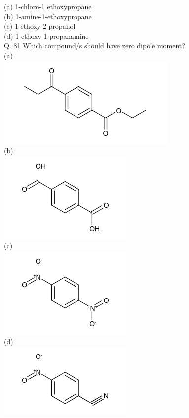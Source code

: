 \documentclass[10pt]{article}
\begin{document}
(a) 1-chloro-1 ethoxypropane\\
(b) 1-amine-1-ethoxypropane\\
(c) 1-ethoxy-2-propanol\\
(d) 1-ethoxy-1-propanamine\\
Q. 81 Which compound/s should have zero dipole moment?\\
(a)\\
\includegraphics{smile-57aeb28f6f16a3f25061c0d87fe5c1c28f51201f}\\
(b)\\
\includegraphics{smile-83831c5e7beebdc86d8c08ac970e418ca4ca8ad5}\\
(c)\\
\includegraphics{smile-2275aeff27d853e5251bb11b78bb48f2223928f6}\\
(d)\\
\includegraphics{smile-17b59068e875bf75d298d3fdf4c719867a51ab24}\\
\end{document}

